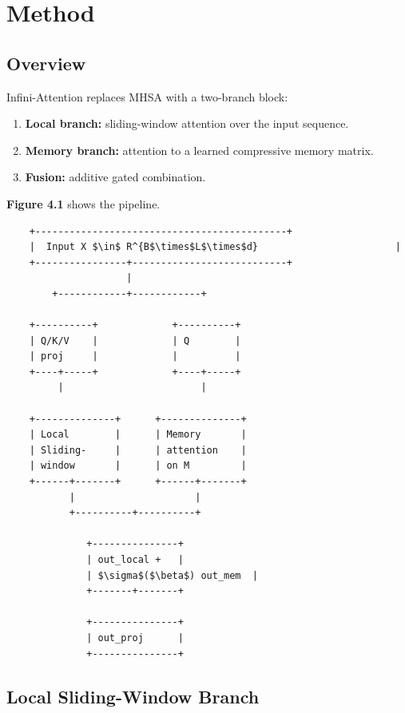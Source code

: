 
\section{Method}

\subsection{Overview}

Infini-Attention replaces MHSA with a two-branch block:

\begin{enumerate}
\item \textbf{Local branch:} sliding-window attention over the input sequence.
\item \textbf{Memory branch:} attention to a learned compressive memory matrix.
\item \textbf{Fusion:} additive gated combination.

\end{enumerate}
\textbf{Figure 4.1} shows the pipeline.

\begin{lstlisting}
    +--------------------------------------------+
    |  Input X $\in$ R^{B$\times$L$\times$d}                        |
    +----------------+---------------------------+
                     |
        +------------+------------+
                                   
    +----------+             +----------+
    | Q/K/V    |             | Q        |
    | proj     |             |          |
    +----+-----+             +----+-----+
         |                        |
                                   
    +--------------+      +--------------+
    | Local        |      | Memory       |
    | Sliding-     |      | attention    |
    | window       |      | on M         |
    +------+-------+      +------+-------+
           |                     |
           +----------+----------+
                       
              +---------------+
              | out_local +   |
              | $\sigma$($\beta$) out_mem  |
              +-------+-------+
                       
              +---------------+
              | out_proj      |
              +---------------+
\end{lstlisting}

\subsection{Local Sliding-Window Branch}


